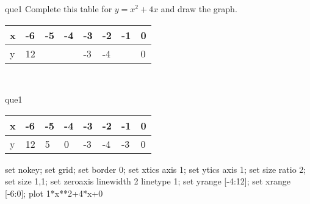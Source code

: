 \documentclass[13.5pt, varwidth=true]{beamer}
\begin{document}
\begin{frame}[shrink=19,fragile]
	\begin{beamercolorbox}[rounded=true, left, shadow=true,wd=14.8cm]{que1}
		 Complete this table for $y = x^{2} + 4x$ and draw the graph. \\[0.3cm] \renewcommand{\arraystretch}{1.2}\begin{tabular}{|C|C|C|C|C|C|C|C|} \hline x & -6 & -5 & -4 & -3 & -2 & -1 & 0 \\ \hline y & 12 &  &  & -3 & -4 &  & 0\\ \hline \end{tabular}\\[0.3cm]
	\end{beamercolorbox}
\end{frame}
\begin{frame}[shrink=19,fragile]
	\begin{beamercolorbox}[rounded=true, left, shadow=true,wd=14.8cm]{que1}
		\renewcommand{\arraystretch}{1.2}\begin{tabular}{|C|C|C|C|C|C|C|C|} \hline x & -6 & -5 & -4 & -3 & -2 & -1 & 0 \\ \hline y & 12 & 5 & 0 & -3 & -4 & -3 & 0\\ \hline \end{tabular}\begin{gnuplot}[terminal=pdf] set nokey; set grid; set border 0; set xtics axis 1; set ytics axis 1; set size ratio 2; set size 1,1; set zeroaxis linewidth 2 linetype 1; set yrange [-4:12]; set xrange [-6:0]; plot 1*x**2+4*x+0 \end{gnuplot}
	\end{beamercolorbox}
\end{frame}
\end{document}
